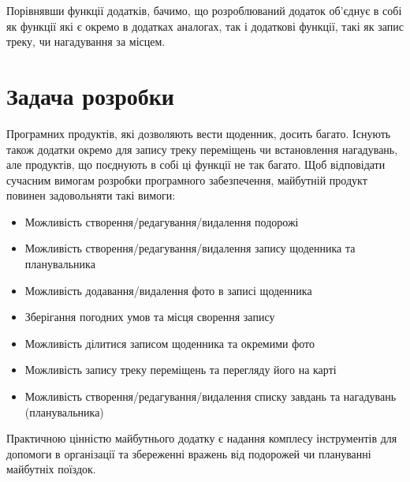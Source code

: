 \documentclass[../main.tex]{subfiles}
\begin{document}
Порівнявши функції додатків, бачимо, що розроблюваний додаток об'єднує в собі як функції які є окремо в додатках аналогах, так і додаткові функції, такі як запис треку, чи нагадування за місцем.

\section{Задача розробки}

Програмних продуктів, які дозволяють вести щоденник, досить багато. Існують також додатки окремо для запису треку переміщень чи встановлення нагадувань, але продуктів, що поєднують в собі ці функції не так багато.
Щоб відповідати сучасним вимогам розробки програмного забезпечення, майбутній продукт повинен задовольняти такі вимоги: 

\begin{itemize}
	\item Можливість створення/редагування/видалення подорожі
	\item Можливість створення/редагування/видалення запису щоденника та планувальника
	\item Можливість додавання/видалення фото в записі щоденника
	\item Зберігання погодних умов та місця сворення запису
	\item Можливість ділитися записом щоденника та окремими фото
	\item Можливість запису треку переміщень та перегляду його на карті
	\item Можливість створення/редагування/видалення списку завдань та нагадувань (планувальника)
\end{itemize}

Практичною цінністю майбутнього додатку є надання комплесу інструментів для допомоги в організації та збереженні вражень від подорожей чи плануванні майбутніх поїздок.

\end{document}
